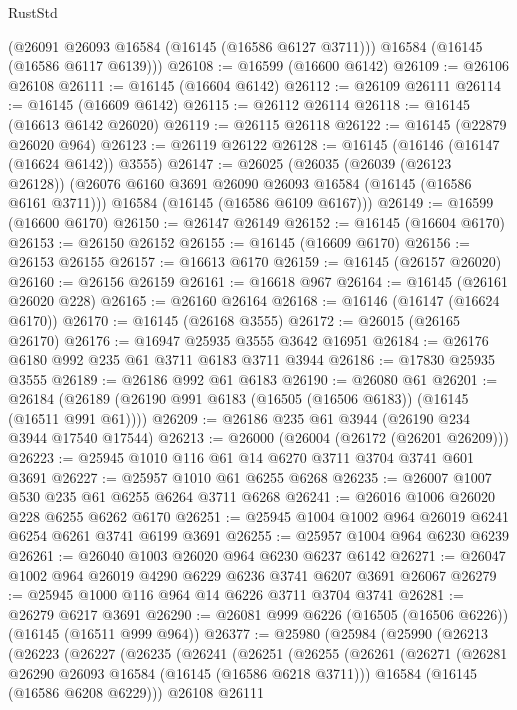 \begin{lexlean}{RustStd}
\begin{coremodule}
      (@26091 @26093 @16584 (@16145 (@16586 @6127 @3711)))
      @16584
      (@16145 (@16586 @6117 @6139)))
@26108 := @16599 (@16600 @6142)
@26109 := @26106 @26108
@26111 := @16145 (@16604 @6142)
@26112 := @26109 @26111
@26114 := @16145 (@16609 @6142)
@26115 := @26112 @26114
@26118 := @16145 (@16613 @6142 @26020)
@26119 := @26115 @26118
@26122 := @16145 (@22879 @26020 @964)
@26123 := @26119 @26122
@26128 := @16145 (@16146 (@16147 (@16624 @6142)) @3555)
@26147 := @26025
    (@26035
      (@26039 (@26123 @26128))
      (@26076 @6160 @3691 @26090 @26093 @16584 (@16145 (@16586 @6161 @3711)))
      @16584
      (@16145 (@16586 @6109 @6167)))
@26149 := @16599 (@16600 @6170)
@26150 := @26147 @26149
@26152 := @16145 (@16604 @6170)
@26153 := @26150 @26152
@26155 := @16145 (@16609 @6170)
@26156 := @26153 @26155
@26157 := @16613 @6170
@26159 := @16145 (@26157 @26020)
@26160 := @26156 @26159
@26161 := @16618 @967
@26164 := @16145 (@26161 @26020 @228)
@26165 := @26160 @26164
@26168 := @16146 (@16147 (@16624 @6170))
@26170 := @16145 (@26168 @3555)
@26172 := @26015 (@26165 @26170)
@26176 := @16947 @25935 @3555 @3642 @16951
@26184 := @26176 @6180 @992 @235 @61 @3711 @6183 @3711 @3944
@26186 := @17830 @25935 @3555
@26189 := @26186 @992 @61 @6183
@26190 := @26080 @61
@26201 := @26184 (@26189 (@26190 @991 @6183 (@16505 (@16506 @6183)) (@16145 (@16511 @991 @61))))
@26209 := @26186 @235 @61 @3944 (@26190 @234 @3944 @17540 @17544)
@26213 := @26000 (@26004 (@26172 (@26201 @26209)))
@26223 := @25945 @1010 @116 @61 @14 @6270 @3711 @3704 @3741 @601 @3691
@26227 := @25957 @1010 @61 @6255 @6268
@26235 := @26007 @1007 @530 @235 @61 @6255 @6264 @3711 @6268
@26241 := @26016 @1006 @26020 @228 @6255 @6262 @6170
@26251 := @25945 @1004 @1002 @964 @26019 @6241 @6254 @6261 @3741 @6199 @3691
@26255 := @25957 @1004 @964 @6230 @6239
@26261 := @26040 @1003 @26020 @964 @6230 @6237 @6142
@26271 := @26047 @1002 @964 @26019 @4290 @6229 @6236 @3741 @6207 @3691 @26067
@26279 := @25945 @1000 @116 @964 @14 @6226 @3711 @3704 @3741
@26281 := @26279 @6217 @3691
@26290 := @26081 @999 @6226 (@16505 (@16506 @6226)) (@16145 (@16511 @999 @964))
@26377 := @25980
    (@25984
      (@25990
        (@26213
          (@26223
            (@26227
              (@26235
                (@26241
                  (@26251
                    (@26255
                      (@26261
                        (@26271
                          (@26281 @26290 @26093 @16584 (@16145 (@16586 @6218 @3711)))
                          @16584
                          (@16145 (@16586 @6208 @6229)))
                        @26108
                        @26111

\end{coremodule}
\end{lexlean}
